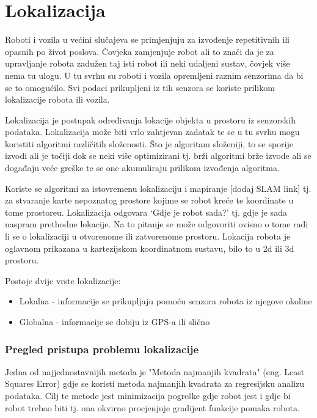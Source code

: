 \section{Lokalizacija}

Roboti i vozila u većini slučajeva se primjenjuju za izvođenje repetitivnih ili opasnih po život poslova. Čovjeka zamjenjuje robot ali to znači da je za upravljanje robota zadužen taj isti robot ili neki udaljeni sustav, čovjek više nema tu ulogu. U tu svrhu su roboti i vozila opremljeni raznim senzorima da bi se to omogućilo. Svi podaci prikupljeni iz tih senzora se koriste prilikom lokalizacije robota ili vozila.

Lokalizacija je postupak određivanja lokacije objekta u prostoru iz senzorskih podataka. Lokalizacija može biti vrlo zahtjevan zadatak te se u tu svrhu mogu koristiti algoritmi različitih složenosti. Što je algoritam složeniji, to se sporije izvodi ali je točiji dok se neki više optimizirani tj. brži algoritmi brže izvode ali se događaju veće greške te se one akumuliraju prilikom izvođenja algoritma.

Koriste se algoritmi za istovremenu lokalizaciju i mapiranje [dodaj SLAM link] tj. za stvaranje karte nepoznatog prostore kojime se robot kreće te koordinate u tome prostoreu. Lokalizacija odgovara `Gdje je robot sada?' tj. gdje je sada naspram prethodne lokacije. Na to pitanje se može odgovoriti ovisno o tome radi li se o lokalizaciji u otvorenome ili zatvorenome prostoru. Lokacija robota je oglavnom prikazana u kartezijskom koordinatnom sustavu, bilo to u 2d ili 3d prostoru.

Postoje dvije vrste lokalizacije:

\begin{itemize}
  \item Lokalna - informacije se prikupljaju pomoću senzora robota iz njegove okoline
  \item Globalna - informacije se dobiju iz GPS-a ili slično
\end{itemize}

\newpage
\subsubsection{Pregled pristupa problemu lokalizacije}

Jedna od najjednostavnijih metoda je "Metoda najmanjih kvadrata" (eng. Least Squares Error) gdje se koristi metoda najmanjih kvadrata za regresijsku analizu podataka. Cilj te metode jest minimizacija pogreške gdje robot jest i gdje bi robot trebao biti tj. ona okvirno procjenjuje gradijent funkcije pomaka robota.

